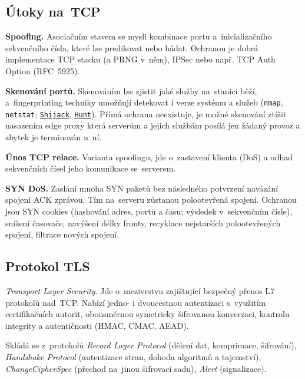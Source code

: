 \subsection{Útoky na~TCP}

\textbf{Spoofing.}
Asociačním stavem se myslí kombinace portu a~inicializačního sekvenčního čísla, které lze predikovat nebo hádat.
Ochranou je dobrá implementace TCP stacku (a PRNG v~něm), IPSec nebo např. TCP Auth Option (RFC~5925).

\textbf{Skenování portů.}
Skenováním lze zjistit jaké služby na~stanici běží, a~fingerprinting techniky umožňují detekovat i verze systému a služeb (\texttt{nmap}, \texttt{netstat}; \href{https://github.com/hackman/shijack}{\texttt{Shijack}}, \href{https://linux.die.net/man/1/hunt}{\texttt{Hunt}}).
Přímá ochrana neexistuje, je možné skenování ztížit nasazením edge proxy která serverům a jejich službám posílá jen žádaný provoz a zbytek je terminován u~ní.

\textbf{Únos TCP relace.}
Varianta spoofingu, jde o~zastavení klienta (DoS) a odhad sekvenčních čísel jeho komunikace se~serverem.

\textbf{SYN DoS.}
Zaslání mnoha SYN paketů bez následného potvrzení navázání spojení ACK zprávou.
Tím na~serveru zůstanou polootevřená spojení.
Ochranou jsou SYN cookies (hashování adres, portů a času; výsledek v~sekvenčním čísle), snížení časovače, navýšení délky fronty, recyklace nejstarších polootevřených spojení, filtrace nových spojení.


\vfill
\subsection{Protokol TLS}

\emph{Transport Layer Security}.
Jde o~mezivrstvu zajištující bezpečný přenos L7 protokolů nad~TCP.
Nabízí jedno- i dvoucestnou autentizaci s~využitím certifikačních autorit, obousměrnou symetricky šifrovanou konverzaci, kontrolu integrity a autentičnosti (HMAC, CMAC, AEAD).

Skládá se z~protokolů \emph{Record Layer Protocol} (dělení dat, komprimace, šifrování), \emph{Handshake Protocol} (autentizace stran, dohoda algoritmů a tajemství), \emph{ChangeCipherSpec} (přechod na~jinou šifrovací sadu), \emph{Alert} (signalizace).

